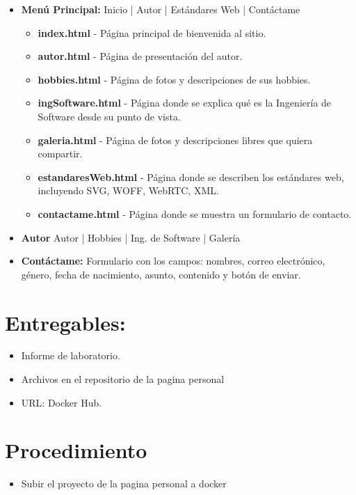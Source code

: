 \documentclass{article}
\begin{document}
\begin{itemize}
    \item \textbf{Menú Principal:}
    Inicio | Autor | Estándares Web | Contáctame
    \begin{itemize}
        \item \textbf{index.html} - Página principal de bienvenida al sitio.
        \item \textbf{autor.html} - Página de presentación del autor.
        \item \textbf{hobbies.html} - Página de fotos y descripciones de sus hobbies.
        \item \textbf{ingSoftware.html} - Página donde se explica qué es la Ingeniería de Software desde su punto de vista.
        \item \textbf{galeria.html} - Página de fotos y descripciones libres que quiera compartir.
        \item \textbf{estandaresWeb.html} - Página donde se describen los estándares web, incluyendo SVG, WOFF, WebRTC, XML.
        \item \textbf{contactame.html} - Página donde se muestra un formulario de contacto.
    \end{itemize}

    \item \textbf{Autor} 
    Autor | Hobbies | Ing. de Software | Galería
    
    \item \textbf{Contáctame:} Formulario con los campos: nombres, correo electrónico, género, fecha de nacimiento, asunto, contenido y botón de enviar.
\end{itemize}

\section{Entregables:}
\begin{itemize}
    \item Informe de laboratorio.
    \item Archivos en el repositorio de la pagina personal
    \item URL: Docker Hub.
\end{itemize}

\section{Procedimiento}
\begin{itemize}
    \item Subir el proyecto de la pagina personal a docker
\end{itemize}
\end{document}
